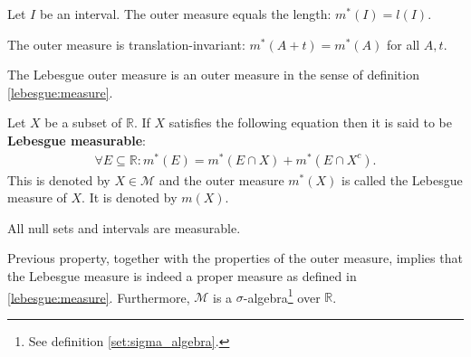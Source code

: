 
    \begin{property}
        Let $I$ be an interval. The outer measure equals the length: $m^*(I) = l(I)$.
    \end{property}
    \begin{property}
        The outer measure is translation-invariant: $m^*(A + t) = m^*(A)$ for all $A,t$.
    \end{property}
    \begin{property}
        The Lebesgue outer measure is an outer measure in the sense of definition \ref{lebesgue:measure}.
    \end{property}

    \begin{theorem}\label{lebesgue:lebesgue_measure}
        Let $X$ be a subset of $\mathbb{R}$. If $X$ satisfies the following equation then it is said to be \textbf{Lebesgue measurable}:
        \begin{gather}
            \forall E\subseteq\mathbb{R}:m^*(E) = m^*(E\cap X) + m^*(E\cap X^c).
        \end{gather}
        This is denoted by $X\in\mathcal{M}$ and the outer measure $m^*(X)$ is called the Lebesgue measure of $X$. It is denoted by $m(X)$.
    \end{theorem}
    \begin{property}
        All null sets and intervals are measurable.
    \end{property}
    \begin{remark}
       Previous property, together with the properties of the outer measure, implies that the Lebesgue measure is indeed a proper measure as defined in \ref{lebesgue:measure}. Furthermore, $\mathcal{M}$ is a $\sigma$-algebra\footnote{See definition \ref{set:sigma_algebra}.} over $\mathbb{R}$.
    \end{remark}

